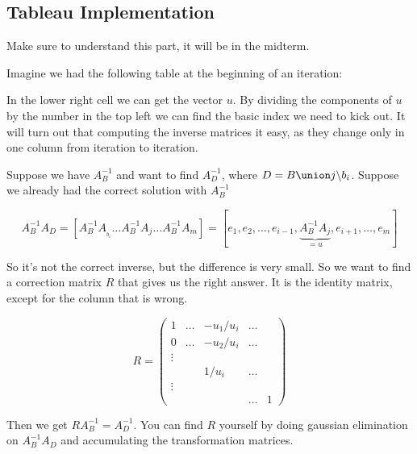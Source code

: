 \subsection*{Tableau Implementation}

Make sure to understand this part, it will be in the midterm.

Imagine we had the following table at the beginning of an iteration:


In the lower right cell we can get the vector $u$. By dividing the components of $u$ by the number in the top left we can find the basic index we need to kick out. It will turn out that computing the inverse matrices it easy, as they change only in one column from iteration to iteration.

Suppose we have $A_B^{-1}$ and want to find $A_D^{-1}$, where $D=B\union j \backslash b_i$. Suppose we already had the correct solution with $A_B^{-1}$ 

\[A_B^{-1}A_D = \left[ A_B^{-1}A_{_b_i}\ldots A_B^{-1}A_j\ldots A_B^{-1}A_m\right] = \left[ e_1,e_2, \ldots, e_{i-1}, \underbrace{A_B^{-1}A_j}_{=u}, e_{i+1},\ldots, e_m\right]\]

So it's not the correct inverse, but the difference is very small. So we want to find a correction matrix $R$ that gives us the right answer. It is the identity matrix, except for the column that is wrong.

\[R= \begin{pmatrix} %
1 & \ldots & -u_1/u_i & \ldots \\
0 & \ldots & -u_2/u_i & \ldots \\
\vdots \\
& & 1/u_i & \ldots\\
\vdots\\
& & & \ldots & 1
\end{pmatrix}\]

Then we get $RA_B^{-1} = A_D^{-1}$. You can find $R$ yourself by doing gaussian elimination on $A_B^{-1}A_D$ and accumulating the transformation matrices.

